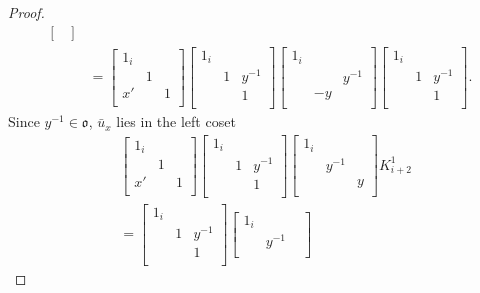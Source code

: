 \documentclass[11pt]{amsart}
\newcommand\oo{\mathfrak{o}}
\newcommand\1{\mathbf{1}}
\newcommand\bu{\bar{u}}
\numberwithin{equation}{section}
\begin{document}
\begin{proof}
\begin{align*}
\begin{bmatrix}
\end{bmatrix} \\
&= 
\begin{bmatrix}
1_{i} & & \\
 &1 &  \\
x' & &1  \\
\end{bmatrix}
\begin{bmatrix}
1_{i} & & \\
 &1 & y^{-1}  \\
 & &1  \\
\end{bmatrix} 
\begin{bmatrix}
1_{i} & & \\
 & & y^{-1} \\
 & -y & \\
\end{bmatrix}
\begin{bmatrix}
1_{i} & & \\
 &1 & y^{-1}  \\
 & &1  \\
\end{bmatrix}.
\end{align*} 
Since $y^{-1} \in \oo$, $\bu_x$ lies in the left coset
\begin{align*}
& \begin{bmatrix}
1_{i} & & \\
 &1 &  \\
x' & &1  \\
\end{bmatrix}
\begin{bmatrix}
1_{i} & & \\
 &1 & y^{-1}  \\
 & &1  \\
\end{bmatrix} 
\begin{bmatrix}
1_{i} & & \\
 &y^{-1} &  \\
 & &y  \\
\end{bmatrix}K_{i+2}^1 \\
&= 
\begin{bmatrix}
1_{i} & & \\
 &1 & y^{-1}  \\
 & &1  \\
\end{bmatrix}
\begin{bmatrix}
1_{i} & & \\
 &y^{-1} &  \\

\end{bmatrix}
\end{align*}
\end{proof}
\end{document}
